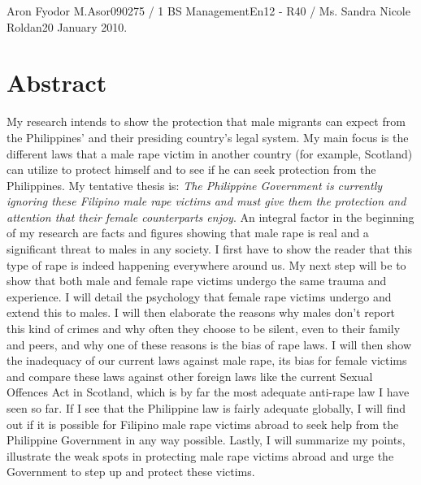 \documentclass[letterpaper]{article}
\begin{document}
\begin{mla}{Aron Fyodor M.}{Asor}{090275 / 1 BS Management}{En12 - R40 / Ms. Sandra Nicole Roldan}{20 January 2010}{. }
\section{Abstract}


My research intends to show the protection that male migrants can expect from the Philippines' and their presiding country's legal system. My main focus is the different laws that a male rape victim in another country (for example, Scotland) can utilize to protect himself and to see if he can seek protection from the Philippines. My tentative thesis is:\textit{ The Philippine Government is currently ignoring these Filipino male rape victims and must give them the protection and attention that their female counterparts enjoy}. An integral factor in the beginning of my research are facts and figures showing that male rape is real and a significant threat to males in any society. I first have to show the reader that this type of rape is indeed happening everywhere around us. My next step will be to show that both male and female rape victims undergo the same trauma and experience. I will detail the psychology that female rape victims   undergo and extend this to males. I will then elaborate the reasons why males don't report this kind of crimes and why often they choose to be silent, even to their family and peers, and why one of these reasons is the bias of rape laws. I will then show the inadequacy of our current laws against male rape, its bias for female victims and compare these laws against other foreign laws like the current Sexual Offences Act in Scotland, which is by far the most adequate anti-rape law I have seen so far. If I see that the Philippine law is fairly adequate globally, I will find out if it is possible for Filipino male rape victims abroad to seek help from the Philippine Government in any way possible. Lastly, I will summarize my points, illustrate the weak spots in protecting male rape victims abroad and urge the Government to step up and protect these victims.


\end{mla}
\end{document}
